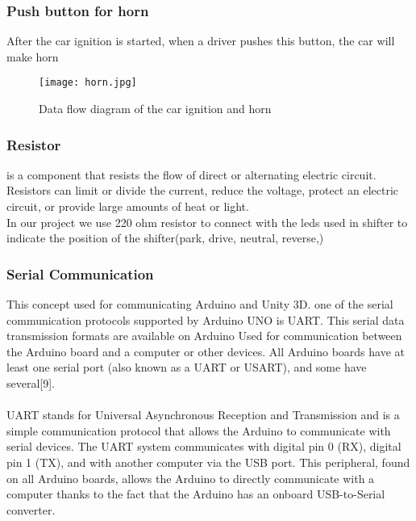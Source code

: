 \documentclass[12pt,a4paper]{article}
\begin{document}
\begin{center}
\begin{center}
\begin{center}
\subsubsection{Push button for horn}
After the car ignition is started, when a driver pushes this button, the car will make horn 
\begin{figure}[H]
	\centering 
	\texttt{[image: horn.jpg]}
	\caption{Data flow diagram of the car ignition and horn }	
\end{figure}

\newline
\subsubsection{Resistor} is a component that resists the flow of direct or alternating electric circuit. Resistors can limit or divide the current, reduce the voltage, protect an electric circuit, or provide large amounts of heat or light.
\\
In our project we use 220 ohm resistor to connect with the leds used in shifter to indicate the position of the shifter(park, drive, neutral, reverse,)


\subsubsection{Serial Communication}

This concept used for communicating Arduino and Unity 3D. one of the serial communication protocols supported by Arduino UNO is UART. This serial data transmission formats are available on Arduino Used for communication between the Arduino board and a computer or other devices. All Arduino boards have at least one serial port (also known as a UART or USART), and some have several[9].\\
\\
UART stands for Universal Asynchronous Reception and Transmission and is a simple communication protocol that allows the Arduino to communicate with serial devices. The UART system communicates with digital pin 0 (RX), digital pin 1 (TX), and with another computer via the USB port. This peripheral, found on all Arduino boards, allows the Arduino to directly communicate with a computer thanks to the fact that the Arduino has an onboard USB-to-Serial converter.
\\

\end{center}
\end{center}
\end{center}
\end{document}
